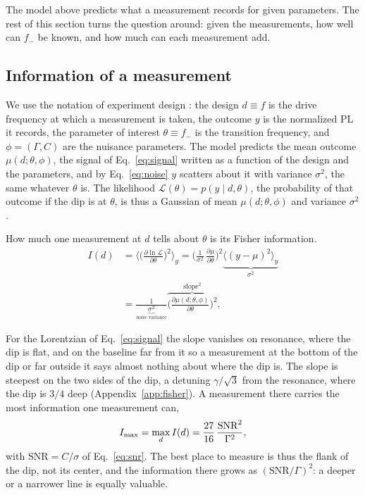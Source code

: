 The model above predicts what a measurement records for given parameters. The rest of this section turns the
question around: given the measurements, how well can $f_-$ be known, and how much can each measurement add.

\subsection{Information of a measurement}
\label{sec:fisher}

We use the notation of experiment design \cite{chaloner1995bayesian}: the design $d\equiv f$ is
the drive frequency at which a measurement is taken, the outcome $y$ is the normalized PL it records, the parameter of interest $\theta\equiv f_-$ is the transition frequency, and $\phi=(\Gamma,C)$ are the
nuisance parameters. The model predicts the mean outcome $\mu(d;\theta,\phi)$, the signal of Eq.~\eqref{eq:signal}
written as a function of the design and the parameters, and by Eq.~\eqref{eq:noise} $y$ scatters about it with
variance $\sigma^2$, the same whatever $\theta$ is. The likelihood $\mathcal L(\theta)=p(y\mid d,\theta)$, the probability of that outcome
if the dip is at $\theta$, is thus a Gaussian of mean $\mu(d;\theta,\phi)$ and variance $\sigma^2$.

How much one measurement at $d$ tells about $\theta$ is its Fisher information. 
\begingroup\small
\begin{equation}
  \begin{aligned}
  I(d)&=\Big\langle\Big(\frac{\partial\ln\mathcal L}{\partial\theta}\Big)^{\!2}\Big\rangle_{\!y}
  =\Big(\frac{1}{\sigma^2}\,\frac{\partial\mu}{\partial\theta}\Big)^{\!2}
  \underbrace{\big\langle(y-\mu)^2\big\rangle_y}_{\sigma^2}\\
  &=\frac{1}{\underbrace{\sigma^2}_{\text{noise variance}}}
  \overbrace{\Big(\frac{\partial\mu(d;\theta,\phi)}{\partial\theta}\Big)^{\!2}}^{\text{slope}^2},
  \end{aligned}
  \label{eq:fisher}
\end{equation}
\endgroup

For the Lorentzian of Eq.~\eqref{eq:signal} the slope vanishes on resonance, where the dip is flat, and on the
baseline far from it so a measurement at the bottom of the dip or far outside it says almost nothing about where the
dip is. The slope is steepest on the two sides of the dip, a detuning $\gamma/\sqrt3$ from the resonance, where the
dip is $3/4$ deep (Appendix~\ref{app:fisher}). A measurement there carries the most information one measurement
can,
\begin{equation}
  I_{\rm max}=\max_d I(d)=\frac{27}{16}\,\frac{\mathrm{SNR}^2}{\Gamma^2},
  \label{eq:istar}
\end{equation}
with $\mathrm{SNR}=C/\sigma$ of Eq.~\eqref{eq:snr}. The best place to measure is thus the flank of the dip, not its
center, and the information there grows as $(\mathrm{SNR}/\Gamma)^2$: a deeper or a narrower line is equally
valuable.

